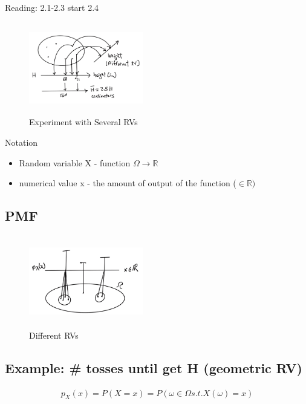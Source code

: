 
 Reading: 2.1-2.3 start 2.4

\begin{figure}[h]
\centering
\includegraphics[width=5cm, height=4cm]{images/L05/diff_rvs.jpeg}
\caption{Experiment with Several RVs}
\end{figure}

 Notation
\begin{itemize}
    \item Random variable X - function $\Omega \rightarrow \mathbb{R}$
    \item numerical value x - the amount of output of the function ($\in \mathbb{R})$
\end{itemize}

\subsection{PMF}


\begin{figure}[h]
\centering
\includegraphics[width=5cm, height=4cm]{images/L05/pmf_px.jpeg}
\caption{Different RVs}
\end{figure}

\subsection{Example: \# tosses until get H (geometric RV)}

\begin{align*}
    p_X(x)=P(X=x)=P({\omega \in \Omega s.t. X(\omega)=x})
\end{align*}

